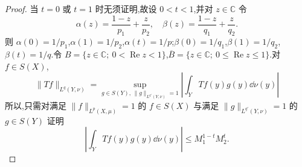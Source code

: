 \begin{proof}
当 $t = 0$ 或 $t = 1$ 时无须证明,故设 $0 < t < 1$,并对 $z \in \mathbb{C}$ 令
\begin{equation*}
\alpha(z) = \frac{1 - z}{p_{1}} + \frac{z}{p_{2}}, \quad \beta(z) = \frac{1 - z}{q_{1}} + \frac{z}{q_{2}}.
\end{equation*}
则 $\alpha(0) = 1/p_{1}$,$\alpha(1) = 1/p_{2}$,$\alpha(t) = 1/p$;$\beta(0) = 1/q_{1}$,$\beta(1) = 1/q_{2}$,$\beta(t) = 1/q$.令 $B = \{z \in \mathbb{C};\ 0 < \operatorname{Re} z < 1\}$,$\overline{B} = \{z \in \mathbb{C};\ 0 \leq \operatorname{Re} z \leq 1\}$.对 $f \in S(X)$,
\begin{equation*}
\| Tf \|_{L^{q}(Y, \nu)} = \sup_{g \in S(Y),\, \| g \|_{L^{q'}(Y, \nu)} = 1}\left|\int_{Y} Tf(y)g(y)\dd \nu(y)\right|
\end{equation*}
所以,只需对满足 $\|f\|_{L^{p}(X, \mu)} = 1$ 的 $f \in S(X)$ 与满足 $\|g\|_{L^{q'}(Y, \nu)} = 1$ 的 $g \in S(Y)$ 证明
\begin{equation*}
\left|\int_{Y} Tf(y)g(y)\dd \nu(y)\right| \leq M_{1}^{1-t}M_{2}^{t}.
\end{equation*}


\end{proof}
